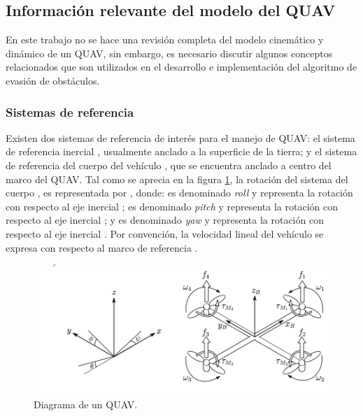 \subsection{Información relevante del modelo del QUAV}

En este trabajo no se hace una revisión completa del modelo cinemático y dinámico de un QUAV, sin embargo, es necesario discutir algunos conceptos relacionados que son utilizados en el desarrollo e implementación del algoritmo de evasión de obstáculos.

\subsubsection{Sistemas de referencia}

Existen dos sistemas de referencia de interés para el manejo de QUAV: el sistema de referencia inercial , usualmente anclado a la superficie de la tierra; y el sistema de referencia del cuerpo del vehículo , que se encuentra anclado a centro del marco del QUAV. Tal como se aprecia en la figura \ref{fig:QUAV-model}, la rotación del sistema del cuerpo , es representada por \jim{\phi,\theta,\psi} \cite{multidrone2015modeling}, donde: \jim{\phi} es denominado \textit{roll} y representa la rotación con respecto al eje inercial ; \jim{\theta} es denominado \textit{pitch} y representa la rotación con respecto al eje inercial ; y \jim{\psi} es denominado \textit{yaw} y representa la rotación con respecto al eje inercial . Por convención, la velocidad lineal del vehículo  se expresa con respecto al marco de referencia .

\begin{figure}[H]
    \centering
    \includegraphics[scale=0.65]{partes/ImgJoao/QUAV-model.png}
    \caption[Diagrama de un QUAV.]{Diagrama de un QUAV\footnotemark.} 
    \label{fig:QUAV-model}
\end{figure}

